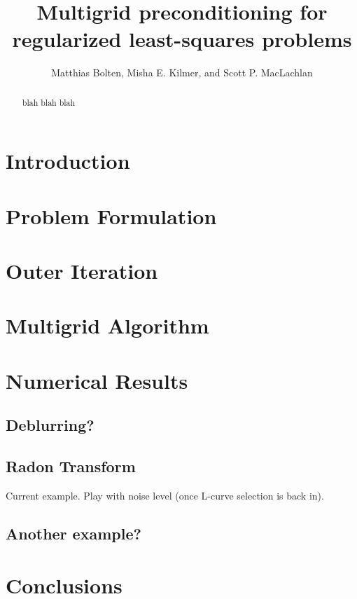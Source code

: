 \documentclass{article}
\title{Multigrid preconditioning for regularized least-squares problems}
\author{Matthias Bolten, Misha E. Kilmer, and Scott P. MacLachlan}
\begin{document}
\maketitle

\begin{abstract}
blah blah blah
\end{abstract}


\section{Introduction}


\section{Problem Formulation}


\section{Outer Iteration}


\section{Multigrid Algorithm}



\section{Numerical Results}

\subsection{Deblurring?}

\subsection{Radon Transform}

Current example.  Play with noise level (once L-curve selection is
back in).

\subsection{Another example?}

\section{Conclusions}

 
\end{document}
